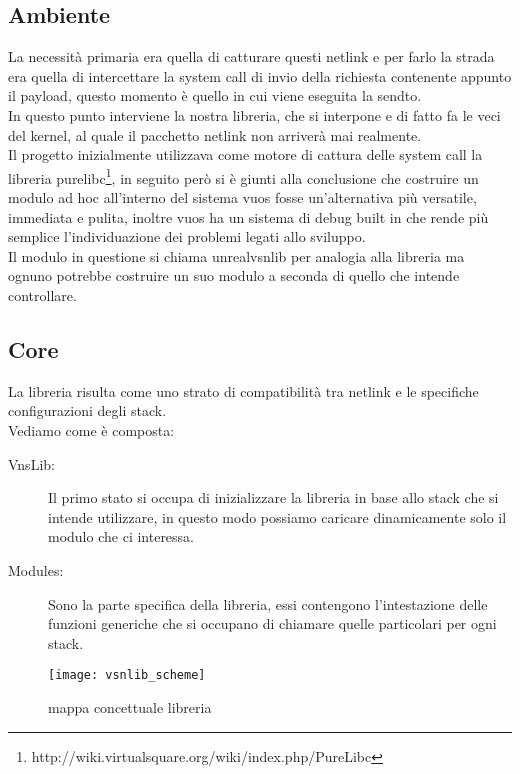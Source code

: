 \subsection{Ambiente}
La necessit\`a primaria era quella di catturare questi netlink e per farlo la strada era quella di intercettare la system call di invio della richiesta contenente appunto il payload, questo momento \`e quello in cui viene eseguita la sendto.\\
In questo punto interviene la nostra libreria, che si interpone e di fatto fa le veci del kernel, al quale il pacchetto netlink non arriver\`a mai realmente.\\
Il progetto inizialmente utilizzava come motore di cattura delle system call la libreria purelibc\footnote{http://wiki.virtualsquare.org/wiki/index.php/PureLibc}, in seguito per\`o si \`e giunti alla conclusione che costruire un modulo ad hoc all'interno del sistema vuos fosse un'alternativa pi\`u versatile, immediata e pulita, inoltre vuos ha un sistema di debug built in che rende pi\`u semplice l'individuazione dei problemi legati allo sviluppo.\\
Il modulo in questione si chiama unrealvsnlib per analogia alla libreria ma ognuno potrebbe costruire un suo modulo a seconda di quello che intende controllare.\\

\subsection{Core}
La libreria risulta come uno strato di compatibilit\`a tra netlink e le specifiche configurazioni degli stack.\\
Vediamo come \`e composta:
\begin{description}                     %
  \item[VnsLib:] Il primo stato si occupa di inizializzare la libreria in base allo stack che si intende utilizzare, in questo modo possiamo caricare dinamicamente solo il modulo che ci interessa.
  \item[Modules:] Sono la parte specifica della libreria, essi contengono l'intestazione delle funzioni generiche che si occupano di chiamare quelle particolari per ogni stack.
\end{description}
\begin{figure}[h]                       %
\begin{center}                          %
\texttt{[image: vsnlib\_scheme]}%
%
\caption[mappa concettuale libreria]{mappa concettuale libreria}\label{fig:map}
\end{center}
\end{figure}



